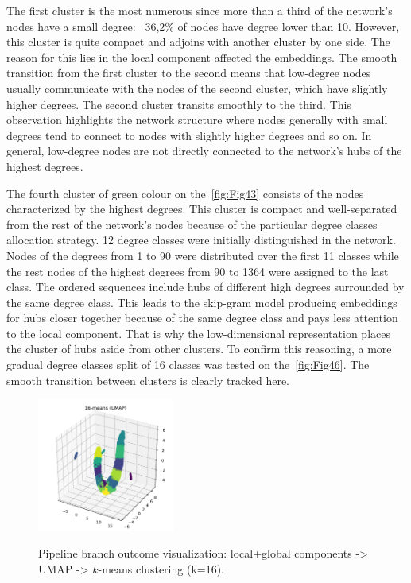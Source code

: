 The first cluster is the most numerous since more than a third of the network's nodes have a small degree: ~36,2\% of nodes have degree lower than 10. However, this cluster is quite compact and adjoins with another cluster by one side. The reason for this lies in the local component affected the embeddings. The smooth transition from the first cluster to the second means that low-degree nodes usually communicate with the nodes of the second cluster, which have slightly higher degrees. The second cluster transits smoothly to the third. This observation highlights the network structure where nodes generally with small degrees tend to connect to nodes with slightly higher degrees and so on. In general, low-degree nodes are not directly connected to the network's hubs of the highest degrees. 

The fourth cluster of green colour on the~\autoref{fig:Fig43} consists of the nodes characterized by the highest degrees. This cluster is compact and well-separated from the rest of the network's nodes because of the particular degree classes allocation strategy. 12 degree classes were initially distinguished in the network. Nodes of the degrees from 1 to 90 were distributed over the first 11 classes while the rest nodes of the highest degrees from 90 to 1364 were assigned to the last class. The ordered sequences include hubs of different high degrees surrounded by the same degree class. This leads to the skip-gram model producing embeddings for hubs closer together because of the same degree class and pays less attention to the local component. That is why the low-dimensional representation places the cluster of hubs aside from other clusters. To confirm this reasoning, a more gradual degree classes split of 16 classes was tested on the~\autoref{fig:Fig46}. The smooth transition between clusters is clearly tracked here.

\begin{figure}[!ht]
	\centering
	\includegraphics[width=0.4\textwidth]{images/evaluations/Fig46.pdf}\\
	\caption{Pipeline branch outcome visualization: local+global components -> UMAP -> $k$-means clustering (k=16).}
	\label{fig:Fig46}
\end{figure}

